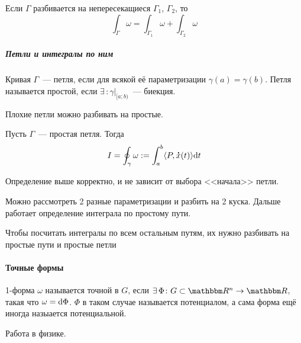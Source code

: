 \documentclass[12pt,timbord]{../../../notes}
\begin{document}
\begin{rem}
  Если $\Gamma$ разбивается на непересекащиеся $\Gamma_1$, $\Gamma_2$, то 
  \[
    \int_\Gamma \omega = \int_{\Gamma_1} \omega + \int_{\Gamma_2} \omega
  \]
\end{rem}

\subparagraph{Петли и интегралы по ним}


\begin{defn}\label{defn:lineint::defs::loop}
  Кривая $\Gamma$~--- петля, если для всякой её параметризации $\gamma(a) = \gamma(b)$. 
  Петля называется простой, если $\exists\, \colon \gamma\vert_{[a;b)}$~--- биекция.
\end{defn}
\begin{rem*}
  Плохие петли можно разбивать на простые.
\end{rem*}

\begin{defn}\label{defn:lineint::defs::loopint}
  Пусть $\Gamma$~--- простая петля. Тогда 
  \[
    I = \oint_\gamma \omega := \int_a^b \langle P,\accentset{\mbox{\bfseries .}}{x}(t)\rangle \mathrm{d} t
  \]
\end{defn}
\begin{prop}\label{prop:lineint::defs::loopint}
  Определение выше корректно, и не зависит от выбора <<начала>> петли. 
\end{prop}  
\begin{itlproof}
  Можно рассмотреть 2 разные параметризации и разбить на 2 куска. Дальше работает определение
  интеграла по простому пути.
\end{itlproof}

\begin{rem*}
  Чтобы посчитать интегралы по всем остальным путям, их нужно разбивать на простые пути и
  простые петли
\end{rem*}


\paragraph{Точные формы}
\label{par:lineint::precforms}

\begin{defn}\label{defn:lineint::precforms::def}
  1-форма $\omega$ называется точной в $G$, если $\exists\, \Phi\colon G\subset \R^n\to \R$, такая что
  $\omega =  \mathrm{d} \Phi$. $\Phi$ в таком случае называется потенциалом, а сама форма ещё иногда
  назыается потенциальной.
\end{defn}
\begin{exmp*}
  Работа в физике.
\end{exmp*}
\end{document}
